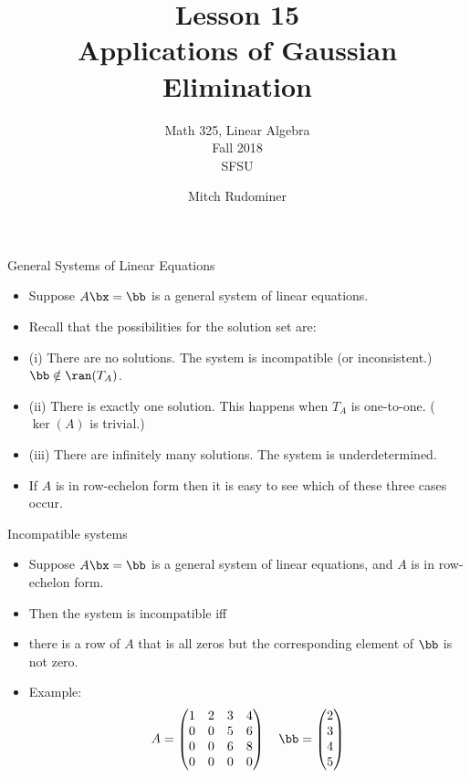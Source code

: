 \documentclass{beamer}
\title{Lesson 15 \\ Applications of Gaussian Elimination}
\subtitle{Math 325, Linear Algebra \\ Fall 2018 \\ SFSU}
\author{Mitch Rudominer}
\date{}
\begin{document}
\begin{frame}
  \titlepage
\end{frame}


\begin{frame}{General Systems of Linear Equations}

\begin{itemize}
\item Suppose $A\bx=\bb$ is a general system of linear equations.
\item Recall that the possibilities for the solution set are:
\item (i) There are no solutions. The system is incompatible (or inconsistent.) $\bb\notin\ran(T_A)$.
\item (ii) There is exactly one solution. This happens when $T_A$ is one-to-one. ( $\ker(A)$ is trivial.)
\item (iii) There are infinitely many solutions. The system is underdetermined.
\item If $A$ is in row-echelon form then it is easy to see which of these three cases occur.
\end{itemize}
\end{frame}


\begin{frame}{Incompatible systems}

\begin{itemize}
\item Suppose $A\bx=\bb$ is a general system of linear equations, and $A$ is in row-echelon form.
\item Then the system is incompatible iff
\item there is a row of $A$ that is all zeros but the corresponding element of $\bb$ is not zero.
\item Example:
$$
A =
\begin{pmatrix}
1 & 2 & 3 & 4 \\
0 & 0 & 5 & 6 \\
0 & 0 & 6 & 8 \\
0 & 0 & 0 & 0 \\
\end{pmatrix}
\quad
\bb=
\begin{pmatrix}
2 \\ 3 \\ 4 \\ 5
\end{pmatrix}
$$

\end{itemize}
\end{frame}
\end{document}
